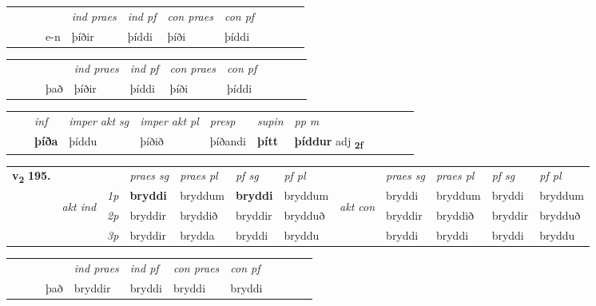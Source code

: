 \begin{tabular}{llllllllllll}
 & &  & &  \textit{ind praes} & \textit{ind pf} & \textit{con praes} & \textit{con pf} \\*
&  & & e-n & þíðir & þíddi & þíði & þíddi \\*
\cmidrule{5-9}
\end{tabular}


\begin{tabular}{llllllllllll}
 & &  & &  \textit{ind praes} & \textit{ind pf} & \textit{con praes} & \textit{con pf} \\*
&  & & það & þíðir & þíddi & þíði & þíddi \\*
\cmidrule{5-9}
\end{tabular}


\begin{tabular}{llllllllllll}
 & & \textit{inf} & \textit{imper akt sg} & \textit{imper akt pl}   & \textit{presp} & \textit{supin}  & \textit{pp m}     \\*
  & & \textbf{þíða} & þíddu  & þíðið   & þíðandi &  \textbf{þítt}  & \textbf{þíddur} adj \textbf{\textsubscript{2f}} \\*
\cmidrule{1-12}
\end{tabular}



\begin{tabular}{llllllllllll} \toprule
\multirow{4}{*}{{{\textbf{v{\textsubscript{2}}} \Large{\textbf{195.}}}}}  & &   &  \textit{praes sg}  & \textit{praes pl}  &\textit{ pf sg} & \textit{pf pl} &  &  \textit{praes sg}  & \textit{praes pl}  & \textit{pf sg} & \textit{pf pl } \\*
	\cmidrule{4-7} \cmidrule{9-12}
 & \multirow{3}{*}{\begin{turn}{90}\textit{akt ind}\end{turn}} & {\textit{1p}} & \textbf{bryddi} & bryddum    & \textbf{bryddi} & bryddum & \multirow{3}{*}{\begin{turn}{90}\textit{akt con}\end{turn}} &bryddi & bryddum & bryddi & bryddum\\*
& &  {\textit{2p}} &  bryddir  & bryddið   & bryddir & brydduð & & bryddir & bryddið & bryddir & brydduð \\*
& &  {\textit{3p}} & bryddir & brydda   & bryddi & bryddu & & bryddi & bryddi& bryddi & bryddu  \\*
\cmidrule{4-7} \cmidrule{9-12}
\end{tabular}


\begin{tabular}{llllllllllll}
 & &  & &  \textit{ind praes} & \textit{ind pf} & \textit{con praes} & \textit{con pf} \\*
&  & & það & bryddir & bryddi & bryddi & bryddi \\*
\cmidrule{5-9}
\end{tabular}


